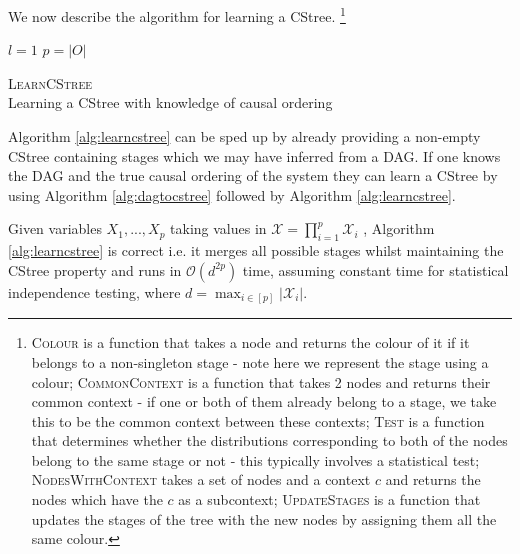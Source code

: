 \documentclass{tufte-book}
\begin{document}
 \newpage 
We now describe the algorithm for learning a CStree.  \footnote{\textsc{Colour} is a function that takes a node and returns the colour of it if it belongs to a non-singleton stage - note here we represent the stage using a colour; \textsc{CommonContext} is a function that takes 2 nodes and returns their common context - if one or both of them already belong to a stage, we take this to be the common context between these contexts; \textsc{Test} is a function that determines whether the distributions corresponding to both of the nodes belong to the same stage or not - this typically involves a statistical test; \textsc{NodesWithContext} takes a set of nodes and a context $c$ and returns the nodes which have the $c$ as a subcontext; \textsc{UpdateStages} is a function that updates the stages of the tree with the new nodes by assigning them all the same colour.} 

\begin{algorithm}[H]\label{alg:learncstree}
\SetAlgoLined
{}
$l=1$\;
$p=|O|$\;
\caption{\textsc{LearnCStree} \\ Learning a CStree with knowledge of causal ordering}
\end{algorithm}

Algorithm \ref{alg:learncstree} can be sped up by already providing a non-empty CStree containing stages which we may have inferred from a DAG. If one knows the DAG and the true causal ordering of the system they can learn a CStree by using Algorithm \ref{alg:dagtocstree} followed by Algorithm \ref{alg:learncstree}.


\begin{theorem}\label{thm:learncstreecorrectness}
Given variables $X_1,...,X_p$ taking values in $\mathcal{X}=\prod_{i=1}^p \mathcal{X}_i$ , Algorithm \ref{alg:learncstree} is correct i.e. it merges all possible stages whilst maintaining the CStree property and runs in $\mathcal{O}(d^{2p})$ time, assuming constant time for statistical independence testing, where $d=\max_{i \in [p]}|\mathcal{X}_i|$.

\end{theorem}
\end{document}

